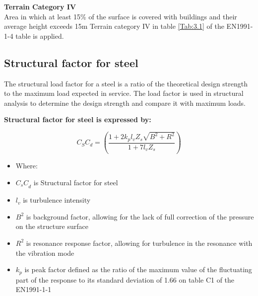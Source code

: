 {%


\textbf{Terrain Category IV}\\
Area in which at least 15\% of the surface is covered with buildings and their average height exceeds 15m Terrain category IV in table \ref{Tab:3.1} of the EN1991-1-4 \cite{en19911} table is applied. 


\subsection{Structural factor for steel} 

The structural load factor for a steel is a ratio of the theoretical design strength to the maximum load expected in service. The load factor is used in structural analysis to determine the design strength and compare it with maximum loads.


\textbf{ Structural factor for steel  is expressed by:}

\begin{equation}
    {C_S}{C_d} =\left(\frac{1+2k_pl_vZ_s\sqrt{B^2+R^2}}{1+7l_vZ_s}\right)
\end{equation}


\begin{itemize}[label={}]
\item {Where:}
\item \( {{C}_{s}{C}}_{d} \) is Structural factor for steel
\item \(l_v\) is turbulence intensity
\item \(B^2\) is background factor, allowing for the lack of full correction of the pressure on the structure surface 
\item \(R^2\) is  resonance response factor, allowing for turbulence in the resonance with the vibration mode
\item \(k_p\) is peak factor defined as the ratio of the maximum value of the fluctuating part of the response to its standard deviation of 1.66 on table C1 of the EN1991-1-1 \cite{en19911} 
\end{itemize}




}
